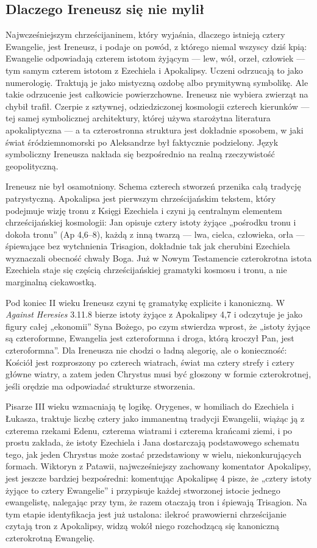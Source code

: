 \subsection{Dlaczego Ireneusz się nie mylił}

Najwcześniejszym chrześcijaninem, który wyjaśnia, dlaczego istnieją cztery Ewangelie, jest Ireneusz, i podaje on powód, z którego niemal wszyscy dziś kpią: Ewangelie odpowiadają czterem istotom żyjącym — lew, wół, orzeł, człowiek — tym samym czterem istotom z Ezechiela i Apokalipsy.
Uczeni odrzucają to jako numerologię.
Traktują je jako mistyczną ozdobę albo prymitywną symbolikę.
Ale takie odrzucenie jest całkowicie powierzchowne.
Ireneusz nie wybiera zwierząt na chybił trafił.
Czerpie z sztywnej, odziedziczonej kosmologii czterech kierunków — tej samej symbolicznej architektury, której używa starożytna literatura apokaliptyczna — a ta czterostronna struktura jest dokładnie sposobem, w jaki świat śródziemnomorski po Aleksandrze był faktycznie podzielony.
Język symboliczny Ireneusza nakłada się bezpośrednio na realną rzeczywistość geopolityczną.

Ireneusz nie był osamotniony.
Schema czterech stworzeń przenika całą tradycję patrystyczną.
Apokalipsa jest pierwszym chrześcijańskim tekstem, który podejmuje wizję tronu z Księgi Ezechiela i czyni ją centralnym elementem chrześcijańskiej kosmologii: Jan opisuje cztery istoty żyjące „pośrodku tronu i dokoła tronu” (Ap 4,6–8), każdą z inną twarzą — lwa, cielca, człowieka, orła — śpiewające bez wytchnienia Trisagion, dokładnie tak jak cherubini Ezechiela wyznaczali obecność chwały Boga.
Już w Nowym Testamencie czterokrotna istota Ezechiela staje się częścią chrześcijańskiej gramatyki kosmosu i tronu, a nie marginalną ciekawostką.

Pod koniec II wieku Ireneusz czyni tę gramatykę explicite i kanoniczną.
W \textit{Against Heresies} 3.11.8 bierze istoty żyjące z Apokalipsy 4,7 i odczytuje je jako figury całej „ekonomii” Syna Bożego, po czym stwierdza wprost, że „istoty żyjące są czteroformne, Ewangelia jest czteroformna i droga, którą kroczył Pan, jest czteroformna”.
Dla Ireneusza nie chodzi o ładną alegorię, ale o konieczność: Kościół jest rozproszony po czterech wiatrach, świat ma cztery strefy i cztery główne wiatry, a zatem jeden Chrystus musi być głoszony w formie czterokrotnej, jeśli orędzie ma odpowiadać strukturze stworzenia.

Pisarze III wieku wzmacniają tę logikę.
Orygenes, w homiliach do Ezechiela i Łukasza, traktuje liczbę cztery jako immanentną tradycji Ewangelii, wiążąc ją z czterema rzekami Edenu, czterema wiatrami i czterema krańcami ziemi, i po prostu zakłada, że istoty Ezechiela i Jana dostarczają podstawowego schematu tego, jak jeden Chrystus może zostać przedstawiony w wielu, niekonkurujących formach.
Wiktoryn z Patawii, najwcześniejszy zachowany komentator Apokalipsy, jest jeszcze bardziej bezpośredni: komentując Apokalipsę 4 pisze, że „cztery istoty żyjące to cztery Ewangelie” i przypisuje każdej stworzonej istocie jednego ewangelistę, nalegając przy tym, że razem otaczają tron i śpiewają Trisagion.
Na tym etapie identyfikacja jest już ustalona: ilekroć prawowierni chrześcijanie czytają tron z Apokalipsy, widzą wokół niego rozchodzącą się kanoniczną czterokrotną Ewangelię.

